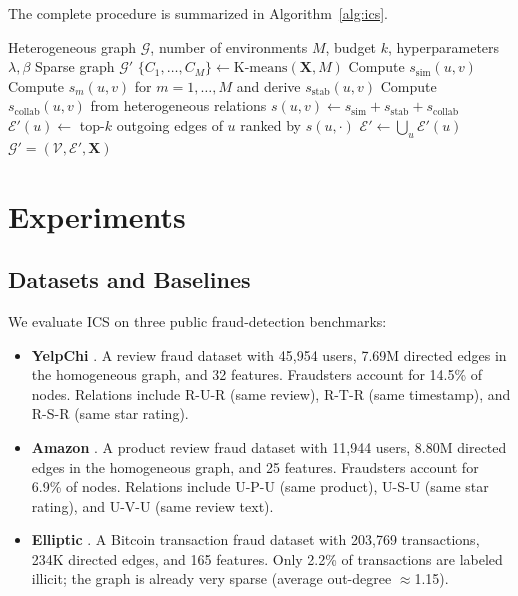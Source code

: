 \documentclass[11pt]{article}
\begin{document}
The complete procedure is summarized in Algorithm~\ref{alg:ics}.

\begin{algorithm}[t]
\caption{Invariant Collaborative Sparsification (ICS)}
\label{alg:ics}
\begin{algorithmic}[1]
\Require Heterogeneous graph $\mathcal{G}$, number of environments $M$, budget $k$, hyperparameters $\lambda,\beta$
\Ensure Sparse graph $\mathcal{G}'$
\State $\{C_1,\dots,C_M\} \gets \text{K-means}(\mathbf{X}, M)$
    \State Compute $s_{\text{sim}}(u,v)$
    \State Compute $s_m(u,v)$ for $m=1,\dots,M$ and derive $s_{\text{stab}}(u,v)$
    \State Compute $s_{\text{collab}}(u,v)$ from heterogeneous relations
    \State $s(u,v) \gets s_{\text{sim}} + s_{\text{stab}} + s_{\text{collab}}$
\EndFor
{}
    \State $\mathcal{E}'(u) \gets$ top-$k$ outgoing edges of $u$ ranked by $s(u,\cdot)$
\EndFor
\State $\mathcal{E}' \gets \bigcup_u \mathcal{E}'(u)$
\State \Return $\mathcal{G}'=(\mathcal{V}, \mathcal{E}', \mathbf{X})$
\end{algorithmic}
\end{algorithm}

\section{Experiments}\label{sec:exp}

\subsection{Datasets and Baselines}

We evaluate ICS on three public fraud-detection benchmarks:
\begin{itemize}
    \item \textbf{YelpChi} \cite{dou2020caregnn}. A review fraud dataset with 45,954 users, 7.69M directed edges in the homogeneous graph, and 32 features. Fraudsters account for 14.5\% of nodes. Relations include R-U-R (same review), R-T-R (same timestamp), and R-S-R (same star rating).
    \item \textbf{Amazon} \cite{dou2020caregnn}. A product review fraud dataset with 11,944 users, 8.80M directed edges in the homogeneous graph, and 25 features. Fraudsters account for 6.9\% of nodes. Relations include U-P-U (same product), U-S-U (same star rating), and U-V-U (same review text).
    \item \textbf{Elliptic} \cite{weber2019anti}. A Bitcoin transaction fraud dataset with 203,769 transactions, 234K directed edges, and 165 features. Only 2.2\% of transactions are labeled illicit; the graph is already very sparse (average out-degree $\approx$1.15).
\end{itemize}
\end{document}
